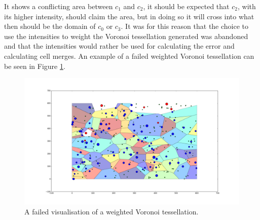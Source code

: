 It shows a conflicting area between $c_1$ and $c_2$, it should be expected that $c_2$, with its higher intensity, should claim the area, but in doing so it will cross into what then should be the domain of $c_0$ or $c_3$. It was for this reason that the choice to use the intensities to weight the Voronoi tessellation generated was abandoned and that the intensities would rather be used for calculating the error and calculating cell merges. An example of a failed weighted Voronoi tessellation can be seen in Figure \ref{fig:w_voronoi}.
\begin{figure}[H]
\includegraphics[width=\textwidth]{Images/weighted_voronoi.png}
\centering
\caption{A failed visualisation of a weighted Voronoi tessellation.}
\label{fig:w_voronoi}
\end{figure}